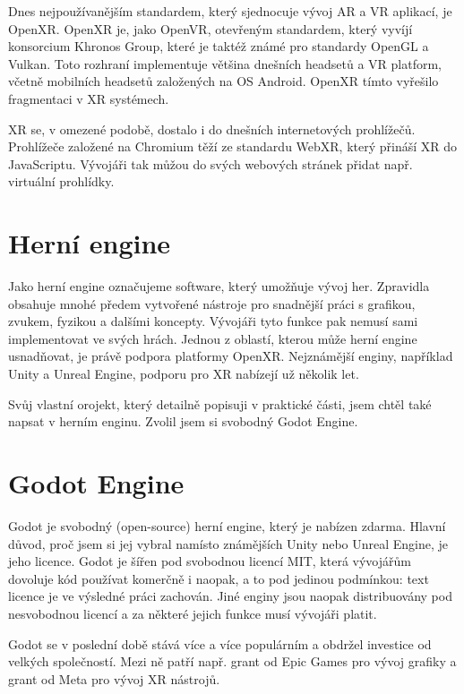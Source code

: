 Dnes nejpoužívanějším standardem, který sjednocuje vývoj AR a VR aplikací, je OpenXR. OpenXR je, jako OpenVR, otevřeným standardem, který vyvíjí konsorcium Khronos Group, které je taktéž známé pro standardy OpenGL a Vulkan. Toto rozhraní implementuje většina dnešních headsetů a VR platform, včetně mobilních headsetů založených na OS Android. OpenXR tímto vyřešilo fragmentaci v XR systémech. \cite{enwiki:1186405367}

XR se, v omezené podobě, dostalo i do dnešních internetových prohlížečů. Prohlížeče založené na Chromium těží ze standardu WebXR, který přináší XR do JavaScriptu. Vývojáři tak můžou do svých webových stránek přidat např. virtuální prohlídky. \cite{webxr_mdn}

\section{Herní engine}

Jako herní engine označujeme software, který umožňuje vývoj her. Zpravidla obsahuje mnohé předem vytvořené nástroje pro snadnější práci s grafikou, zvukem, fyzikou a dalšími koncepty. Vývojáři tyto funkce pak nemusí sami implementovat ve svých hrách. Jednou z oblastí, kterou může herní engine usnadňovat, je právě podpora platformy OpenXR. Nejznámější enginy, například Unity a Unreal Engine, podporu pro XR nabízejí už několik let. \cite{enwiki:1186405367}

Svůj vlastní orojekt, který detailně popisuji v praktické části, jsem chtěl také napsat v herním enginu. Zvolil jsem si svobodný Godot Engine.

\section{Godot Engine}

Godot je svobodný (open-source) herní engine, který je nabízen zdarma. Hlavní důvod, proč jsem si jej vybral namísto známějších Unity nebo Unreal Engine, je jeho licence. Godot je šířen pod svobodnou licencí MIT, která vývojářům dovoluje kód používat komerčně i naopak, a to pod jedinou podmínkou: text licence je ve výsledné práci zachován. Jiné enginy jsou naopak distribuovány pod nesvobodnou licencí a za některé jejich funkce musí vývojáři platit.

Godot se v poslední době stává více a více populárním a obdržel investice od velkých společností. Mezi ně patří např. grant od Epic Games pro vývoj grafiky a grant od Meta pro vývoj XR nástrojů. \cite{godot_epicgames} \cite{godot_meta}

